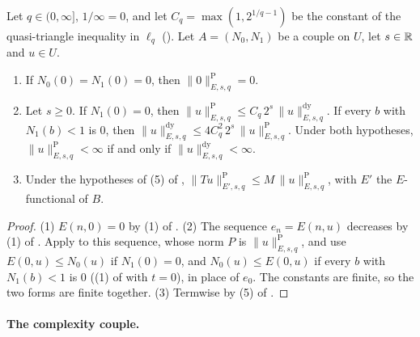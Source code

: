 \begin{lemma}
\label{lem:e-pietsch-norm}
\leanok
{}
Let $q \in (0, \infty]$, $1/\infty = 0$, and let $C_q = \max(1, 2^{1/q - 1})$ be the constant of
the quasi-triangle inequality in $\ell_q$ (). Let $A = (N_0, N_1)$ be
a couple on $U$, let $s \in \mathbb{R}$ and $u \in U$.
\begin{enumerate}
  \item If $N_0(0) = N_1(0) = 0$, then $\|0\|^{\mathrm{P}}_{E, s, q} = 0$.
  \item Let $s \geq 0$. If $N_1(0) = 0$, then
    $\|u\|^{\mathrm{P}}_{E, s, q} \leq C_q \, 2^s \, \|u\|^{\mathrm{dy}}_{E, s, q}$. If every $b$
    with $N_1(b) < 1$ is $0$, then
    $\|u\|^{\mathrm{dy}}_{E, s, q} \leq 4 C_q^2 \, 2^s \, \|u\|^{\mathrm{P}}_{E, s, q}$. Under both
    hypotheses, $\|u\|^{\mathrm{P}}_{E, s, q} < \infty$ if and only if
    $\|u\|^{\mathrm{dy}}_{E, s, q} < \infty$.
  \item Under the hypotheses of (5) of ,
    $\|Tu\|^{\mathrm{P}}_{E', s, q} \leq M \, \|u\|^{\mathrm{P}}_{E, s, q}$, with $E'$ the
    $E$-functional of $B$.
\end{enumerate}
\end{lemma}

\begin{proof}
\leanok
{}
(1) $E(n, 0) = 0$ by (1) of . (2) The sequence $e_n = E(n, u)$
decreases by (1) of . Apply  to this
sequence, whose norm $P$ is $\|u\|^{\mathrm{P}}_{E, s, q}$, and use $E(0, u) \leq N_0(u)$ if
$N_1(0) = 0$, and $N_0(u) \leq E(0, u)$ if every $b$ with $N_1(b) < 1$ is $0$ ((1) of
 with $t = 0$), in place of $e_0$. The constants are finite, so the two
forms are finite together. (3) Termwise by (5) of .
\end{proof}

\paragraph{The complexity couple.}

